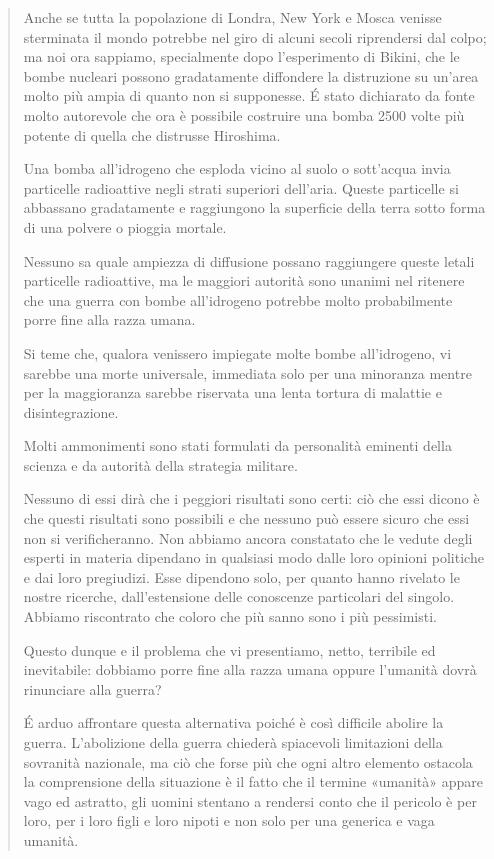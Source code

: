 \documentclass[a4paper, oneside]{article}
\newcounter{i}%
\newcounter{n}%
\begin{document}
\begin{quotation}
Anche se tutta la popolazione di Londra, New York e Mosca venisse sterminata il mondo potrebbe nel giro di alcuni secoli riprendersi dal colpo; ma noi ora sappiamo, specialmente dopo l'esperimento di Bikini, che le bombe nucleari possono gradatamente diffondere la distruzione su un'area molto più ampia di quanto non si supponesse. É stato dichiarato da fonte molto autorevole che ora è possibile costruire una bomba 2500 volte più potente di quella che distrusse Hiroshima.

Una bomba all'idrogeno che esploda vicino al suolo o sott'acqua invia particelle radioattive negli strati superiori dell'aria. Queste particelle si abbassano gradatamente e raggiungono la superficie della terra sotto forma di una polvere o pioggia mortale.

Nessuno sa quale ampiezza di diffusione possano raggiungere queste letali particelle radioattive, ma le maggiori autorità sono unanimi nel ritenere che una guerra con bombe all'idrogeno potrebbe molto probabilmente porre fine alla razza umana.

Si teme che, qualora venissero impiegate molte bombe all'idrogeno, vi sarebbe una morte universale, immediata solo per una minoranza mentre per la maggioranza sarebbe riservata una lenta tortura di malattie e disintegrazione.

Molti ammonimenti sono stati formulati da personalità eminenti della scienza e da autorità della strategia militare.

Nessuno di essi dirà che i peggiori risultati sono certi: ciò che essi dicono è che questi risultati sono possibili e che nessuno può essere sicuro che essi non si verificheranno. Non abbiamo ancora constatato che le vedute degli esperti in materia dipendano in qualsiasi modo dalle loro opinioni politiche e dai loro pregiudizi. Esse dipendono solo, per quanto hanno rivelato le nostre ricerche, dall'estensione delle conoscenze particolari del singolo. Abbiamo riscontrato che coloro che più sanno sono i più pessimisti.

Questo dunque e il problema che vi presentiamo, netto, terribile ed inevitabile: dobbiamo porre fine alla razza umana oppure l'umanità dovrà rinunciare alla guerra?

É arduo affrontare questa alternativa poiché è così difficile abolire la guerra. L'abolizione della guerra chiederà spiacevoli limitazioni della sovranità nazionale, ma ciò che forse più che ogni altro elemento ostacola la comprensione della situazione è il fatto che il termine «umanità» appare vago ed astratto, gli uomini stentano a rendersi conto che il pericolo è per loro, per i loro figli e loro nipoti e non solo per una generica e vaga umanità.


\end{quotation}
\end{document}
